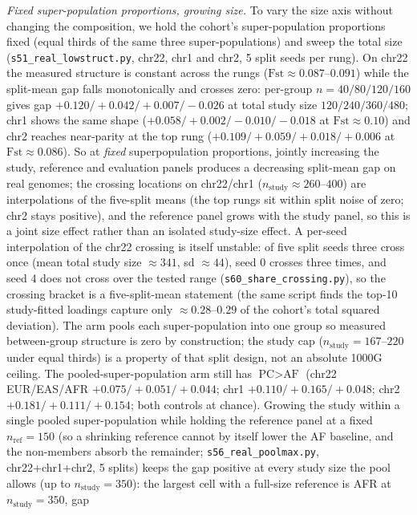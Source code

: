 \documentclass[11pt]{article}
\begin{document}
\emph{Fixed super-population proportions, growing size.} To vary the size axis
without changing the composition, we hold the cohort's super-population
proportions fixed (equal thirds of the same three super-populations) and sweep the
total size
(\texttt{s51\_real\_lowstruct.py}, chr22, chr1 and chr2, 5 split seeds per rung). On
chr22 the measured structure is constant across the rungs ($\text{Fst}\approx
0.087$--$0.091$) while the split-mean gap falls monotonically and crosses zero:
per-group $n{=}40/80/120/160$ gives gap $+0.120 / +0.042 / +0.007 / -0.026$ at
total study size $120/240/360/480$; chr1 shows the same shape
($+0.058 / +0.002 / -0.010 / -0.018$ at $\text{Fst}\approx0.10$) and chr2 reaches
near-parity at the top rung ($+0.109 / +0.059 / +0.018 / +0.006$ at
$\text{Fst}\approx0.086$). So at
\emph{fixed} superpopulation proportions, jointly increasing the study, reference
and evaluation panels produces a decreasing split-mean gap on real genomes; the
crossing locations on chr22/chr1 ($n_{\text{study}}\approx260$--$400$) are
interpolations of the
five-split means (the top rungs sit within split noise of zero; chr2 stays
positive), and the reference panel grows with the study panel, so this is a
joint size effect rather than an isolated study-size effect. A per-seed
interpolation of the chr22 crossing is itself unstable: of five split seeds
three cross once (mean total study size $\approx341$, sd $\approx44$), seed 0
crosses three times, and seed 4 does not cross over the tested range
(\texttt{s60\_share\_crossing.py}), so the crossing bracket is a five-split-mean
statement (the same script finds the top-10 study-fitted loadings capture only
$\approx0.28$--$0.29$ of the cohort's total squared deviation).
The arm pools each
super-population into one group so measured between-group structure is zero by
construction; the study cap ($n_{\text{study}}{=}167$--$220$ under equal thirds) is
a property of that split design, not an absolute 1000G ceiling. The
pooled-super-population arm still has
$\text{PC}>\text{AF}$ (chr22 EUR/EAS/AFR $+0.075/+0.051/+0.044$; chr1
$+0.110/+0.165/+0.048$; chr2 $+0.181/+0.111/+0.154$; both controls at chance).
Growing the study within a single pooled super-population while holding the
reference panel at a fixed $n_{\text{ref}}{=}150$ (so a shrinking reference cannot
by itself lower the AF baseline, and the non-members absorb the remainder;
\texttt{s56\_real\_poolmax.py}, chr22+chr1+chr2, 5 splits) keeps the gap positive
at every study size the pool allows (up to $n_{\text{study}}{=}350$): the largest
cell with a full-size reference is AFR at $n_{\text{study}}{=}350$, gap
\end{document}
